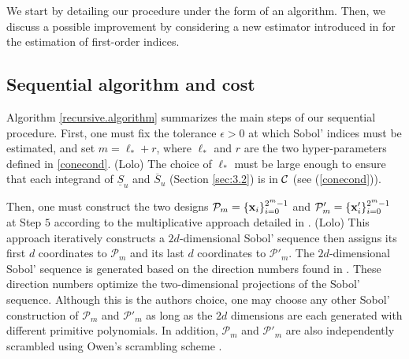 We start by detailing our procedure under the form of an algorithm. Then, we discuss a possible improvement by considering a new estimator introduced in \cite{Owen} for the estimation of first-order indices.


\subsection{Sequential algorithm and cost}
\label{sec:4.1}

Algorithm \ref{recursive.algorithm} summarizes the main steps of our sequential procedure. First, one must fix the tolerance $\epsilon >0$ at which Sobol' indices must be estimated, and set $m=\ell_*+r$, where $\ell_*$ and $r$ are the two hyper-parameters defined in \eqref{conecond}.  {\color{purple} (Lolo) The choice of $\ell_*$ must be large enough to ensure that each integrand of $\underline{S}_u$ and $\overline{S}_u$ (Section \ref{sec:3.2}) is in $\mathcal{C}$ (see  (\ref{conecond})).}

Then, one must construct the two designs $\mathcal{P}_{m}=\{\boldsymbol{\mathbf{x}}_i\}_{i=0}^{2^{m}-1}$ and $\mathcal{P}'_{m}=\{\boldsymbol{\mathbf{x}}'_i\}_{i=0}^{2^{m}-1}$ at Step $5$ according to the multiplicative approach detailed in \cite{GJAHMP}. {\color{purple} (Lolo) This approach iteratively constructs a $2d$-dimensional Sobol' sequence then assigns its first $d$ coordinates to $\mathcal{P}_{m}$ and its last $d$ coordinates to $\mathcal{P}'_{m}$. The $2d$-dimensional Sobol' sequence is generated based on the direction numbers found in \cite{Kuo}. These direction numbers optimize the two-dimensional projections of the Sobol' sequence. Although this is the authors choice, one may choose any other Sobol' construction of $\mathcal{P}_{m}$ and $\mathcal{P}'_{m}$ as long as the $2d$ dimensions are each generated with different primitive polynomials. In addition, $\mathcal{P}_{m}$ and $\mathcal{P}'_{m}$ are also independently scrambled using Owen's scrambling scheme \cite{HonHic00a,Owe95}.}

